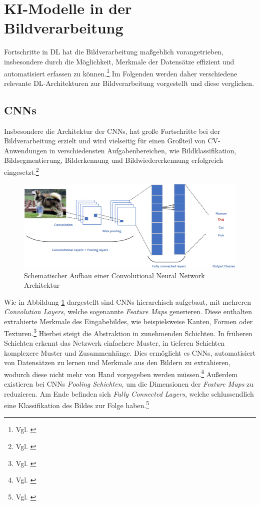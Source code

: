 \section[KI-Modelle in der Bildverarbeitung]{\ac{KI}-Modelle in der Bildverarbeitung}
\label{sec:ki_modelle_bildverarbeitung}

Fortschritte in \ac{DL} hat die Bildverarbeitung maßgeblich vorangetrieben, insbesondere durch die Möglichkeit, Merkmale der Datensätze effizient und automatisiert erfassen zu können.\footnote{Vgl. \cite[S. 1 f.]{chai_deep_2021}} Im Folgenden werden daher verschiedene relevante \ac{DL}-Architekturen zur Bildverarbeitung vorgestellt und diese verglichen.

\subsection{\acfp{CNN}}
Insbesondere die Architektur der \acp{CNN}, hat große Fortschritte bei der Bildverarbeitung erzielt und wird vielseitig für einen Großteil von \ac{CV}-Anwendungen in verschiedensten Aufgabenbereichen, wie Bildklassifikation, Bildsegmentierung, Bilderkennung und Bildwiedererkennung erfolgreich eingesetzt.\footnote{Vgl. \cite[S. 2]{bhatt_cnn_2021}}

\begin{figure}[htb]
      \centering                        
      \includegraphics[width=0.9\linewidth]{graphics/CNN-architecture.jpg}
      \caption[Schematischer Aufbau einer Convolutional Neural Network Architektur]{Schematischer Aufbau einer Convolutional Neural Network Architektur\footnotemark }
      \label{fig:cnn}
\end{figure}

Wie in Abbildung \ref{fig:cnn} dargestellt sind \acp{CNN} hierarchisch aufgebaut, mit mehreren \textit{Convolution Layers}, welche sogenannte \textit{Feature Maps} generieren. Diese enthalten extrahierte Merkmale des Eingabebildes, wie beispielsweise Kanten, Formen oder Texturen.\footnote{Vgl. \cite[94251]{khanam_comprehensive_2024}} Hierbei steigt die Abstraktion in zunehmenden Schichten. In früheren Schichten erkennt das Netzwerk einfachere Muster, in tieferen Schichten komplexere Muster und Zusammenhänge. Dies ermöglicht es \acp{CNN}, automatisiert von Datensätzen zu lernen und Merkmale aus den Bildern zu extrahieren, wodurch diese nicht mehr von Hand vorgegeben werden müssen.\footnote{Vgl. \cite[S. 94251]{khanam_comprehensive_2024}}
Außerdem existieren bei \acp{CNN} \textit{Pooling Schichten}, um die Dimensionen der \textit{Feature Maps} zu reduzieren. Am Ende befinden sich \textit{Fully Connected Layers}, welche schlussendlich eine Klassifikation des Bildes zur Folge haben.\footnote{Vgl. \cite[S. 2]{chai_deep_2021}}

